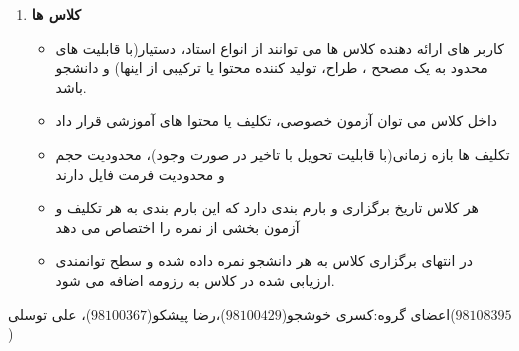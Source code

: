\documentclass{article}
\begin{document}
\begin{enumerate}[\hspace{1cm}1.]
        \item \textbf{کلاس ها}
        \begin{itemize}
            \item کاربر های ارائه دهنده کلاس ها می توانند از انواع استاد، دستیار(با قابلیت های محدود به یک مصحح ، طراح، تولید کننده محتوا یا ترکیبی از اینها) و دانشجو باشد.
            \item داخل کلاس می توان آزمون خصوصی، تکلیف یا محتوا های آموزشی قرار داد
            \item تکلیف ها بازه زمانی(با قابلیت تحویل با تاخیر در صورت وجود)، محدودیت حجم و محدودیت فرمت فایل دارند
            \item هر کلاس تاریخ برگزاری و بارم بندی دارد که این بارم بندی به هر تکلیف و آزمون بخشی از نمره را اختصاص می دهد
            \item در انتهای برگزاری کلاس به هر دانشجو نمره داده شده و سطح توانمندی ارزیابی شده در کلاس به رزومه اضافه می شود.
        \end{itemize}
        
    \end{enumerate}
    \vspace{4cm}
    \centering
    اعضای گروه:کسری خوشجو($98100429$)،رضا پیشکو($98100367$)، علی توسلی($98108395$)
    
\end{document}
